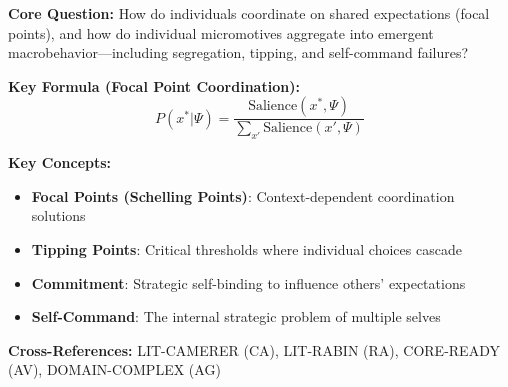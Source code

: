 \begin{tcolorbox}[colback=blue!5!white, colframe=blue!75!black,
    title=Quick Reference: LIT-SCHELLING]

\textbf{Core Question:} How do individuals coordinate on shared expectations
(focal points), and how do individual micromotives aggregate into emergent
macrobehavior---including segregation, tipping, and self-command failures?

\textbf{Key Formula (Focal Point Coordination):}
\begin{equation}
P(x^* | \Psi) = \frac{\text{Salience}(x^*, \Psi)}{\sum_{x'} \text{Salience}(x', \Psi)}
\label{eq:ts-focal}
\end{equation}

\textbf{Key Concepts:}
\begin{itemize}[nosep]
\item \textbf{Focal Points (Schelling Points)}: Context-dependent coordination solutions
\item \textbf{Tipping Points}: Critical thresholds where individual choices cascade
\item \textbf{Commitment}: Strategic self-binding to influence others' expectations
\item \textbf{Self-Command}: The internal strategic problem of multiple selves
\end{itemize}

\textbf{Cross-References:} LIT-CAMERER (CA), LIT-RABIN (RA), CORE-READY (AV), DOMAIN-COMPLEX (AG)
\end{tcolorbox}


